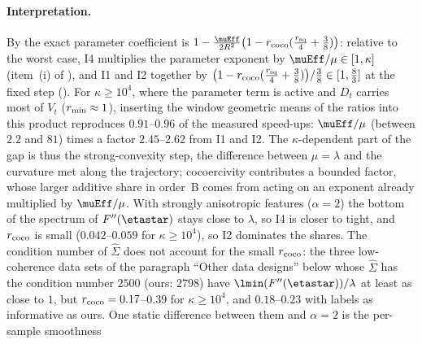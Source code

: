 \paragraph{Interpretation.}
By  the exact parameter coefficient is
$1-\frac{\muEff}{2R^2}\big(1-r_{\rm coco}(\frac{r_{\rm sq}}4+\frac38)\big)$: relative to the worst case, I4 multiplies the
parameter exponent by $\muEff/\mu\in[1,\kappa]$ (item~(i) of ), and I1 and I2 together by
$\big(1-r_{\rm coco}(\frac{r_{\rm sq}}4+\frac38)\big)/\frac38\in[1,\frac83]$ at the fixed step
(). For $\kappa\ge10^4$, where the parameter term is active and $D_t$ carries most of $V_t$
($r_{\rm min}\approx1$), inserting the window geometric means of the ratios into this product reproduces $0.91$--$0.96$ of
the measured speed-ups: $\muEff/\mu$ (between $2.2$ and $81$) times a factor $2.45$--$2.62$ from I1 and I2. The
$\kappa$-dependent part of the gap is thus the strong-convexity step, the difference between $\mu=\lambda$ and the
curvature met along the trajectory; cocoercivity contributes a bounded factor, whose larger additive share in order~B
comes from acting on an exponent already multiplied by $\muEff/\mu$. With strongly anisotropic features ($\alpha=2$) the
bottom of the spectrum of $F''(\etastar)$ stays close to $\lambda$, so I4 is closer to tight, and $r_{\rm coco}$ is small
($0.042$--$0.059$ for $\kappa\ge10^4$), so I2 dominates the shares.
The condition number of $\hat\Sigma$ does not account for the small $r_{\rm coco}$: the three low-coherence data sets of
the paragraph ``Other data designs'' below whose $\hat\Sigma$ has the condition number $2500$ (ours: $2798$) have
$\lmin(F''(\etastar))/\lambda$ at least as close to $1$, but $r_{\rm coco}=0.17$--$0.39$ for $\kappa\ge10^4$, and $0.18$--$0.23$
with labels as informative as ours. One static difference between them and $\alpha=2$ is the per-sample smoothness
